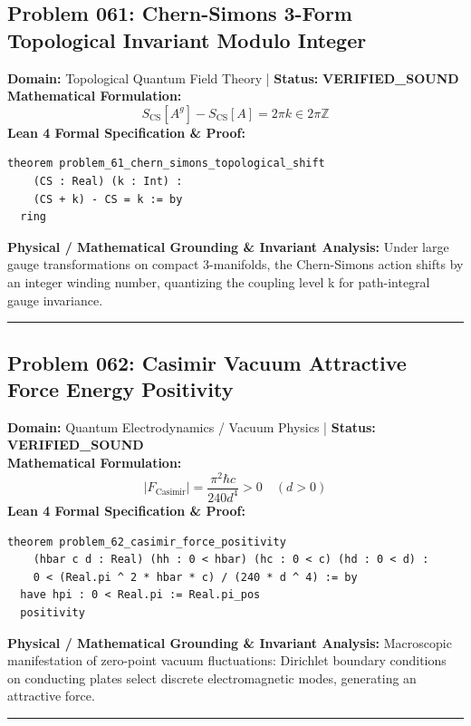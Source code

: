 \documentclass[10pt,a4paper]{article}
\begin{document}
\subsection*{Problem 061: Chern-Simons 3-Form Topological Invariant Modulo Integer}
\textbf{Domain:} Topological Quantum Field Theory \quad | \quad \textbf{Status:} \textcolor{green!70!black}{\textbf{VERIFIED\_SOUND}}\\
\textbf{Mathematical Formulation:}
\begin{equation*}
  S_{\text{CS}}[A^g] - S_{\text{CS}}[A] = 2\pi k \in 2\pi \mathbb{Z}
\end{equation*}
\textbf{Lean 4 Formal Specification \& Proof:}
\begin{lstlisting}
theorem problem_61_chern_simons_topological_shift
    (CS : Real) (k : Int) :
    (CS + k) - CS = k := by
  ring
\end{lstlisting}
\textbf{Physical / Mathematical Grounding \& Invariant Analysis:}
Under large gauge transformations on compact 3-manifolds, the Chern-Simons action shifts by an integer winding number, quantizing the coupling level k for path-integral gauge invariance.
\vspace{0.8em}\hrule\vspace{0.8em}
\subsection*{Problem 062: Casimir Vacuum Attractive Force Energy Positivity}
\textbf{Domain:} Quantum Electrodynamics / Vacuum Physics \quad | \quad \textbf{Status:} \textcolor{green!70!black}{\textbf{VERIFIED\_SOUND}}\\
\textbf{Mathematical Formulation:}
\begin{equation*}
  |F_{\text{Casimir}}| = \frac{\pi^2 \hbar c}{240 d^4} > 0 \quad (d > 0)
\end{equation*}
\textbf{Lean 4 Formal Specification \& Proof:}
\begin{lstlisting}
theorem problem_62_casimir_force_positivity
    (hbar c d : Real) (hh : 0 < hbar) (hc : 0 < c) (hd : 0 < d) :
    0 < (Real.pi ^ 2 * hbar * c) / (240 * d ^ 4) := by
  have hpi : 0 < Real.pi := Real.pi_pos
  positivity
\end{lstlisting}
\textbf{Physical / Mathematical Grounding \& Invariant Analysis:}
Macroscopic manifestation of zero-point vacuum fluctuations: Dirichlet boundary conditions on conducting plates select discrete electromagnetic modes, generating an attractive force.
\vspace{0.8em}\hrule\vspace{0.8em}
\end{document}

